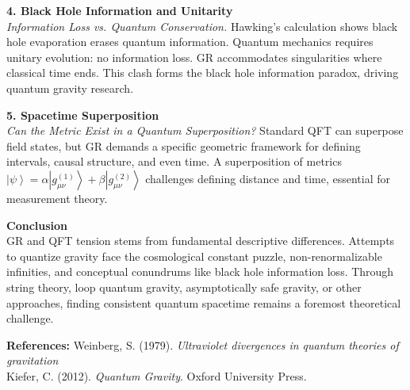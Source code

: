 \begin{technical}
    \noindent\textbf{4. Black Hole Information and Unitarity}\\[0.25em]
    \textit{Information Loss vs. Quantum Conservation.}
    Hawking's calculation shows black hole evaporation erases quantum information. Quantum mechanics requires unitary evolution: no information loss. GR accommodates singularities where classical time ends. This clash forms the black hole information paradox, driving quantum gravity research.

    \noindent\textbf{5. Spacetime Superposition}\\[0.25em]
    \textit{Can the Metric Exist in a Quantum Superposition?}
    Standard QFT can superpose field states, but GR demands a specific geometric framework for defining intervals, causal structure, and even time. A superposition of metrics $\left|\psi\right> = \alpha \left|g_{\mu\nu}^{(1)}\right> + \beta \left|g_{\mu\nu}^{(2)}\right>$ challenges defining distance and time, essential for measurement theory.

    \noindent\textbf{Conclusion}\\[0.25em]
    GR and QFT tension stems from fundamental descriptive differences. Attempts to quantize gravity face the cosmological constant puzzle, non-renormalizable infinities, and conceptual conundrums like black hole information loss. Through string theory, loop quantum gravity, asymptotically safe gravity, or other approaches, finding consistent quantum spacetime remains a foremost theoretical challenge.

    \vspace{0.25em}
    \noindent\textbf{References:}
    Weinberg, S. (1979). \textit{Ultraviolet divergences in quantum theories of gravitation}\\
    Kiefer, C. (2012). \textit{Quantum Gravity}. Oxford University Press.

\end{technical}
